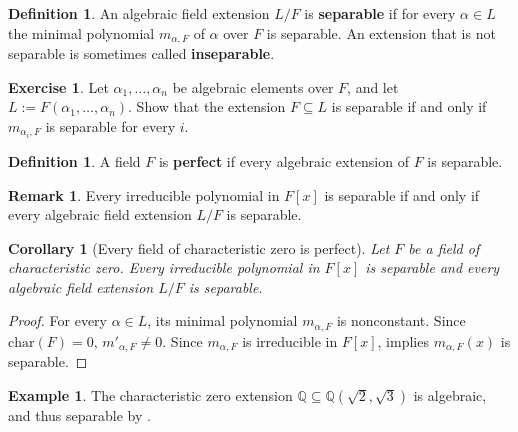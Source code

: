 \documentclass[12pt]{report}
\newtheorem{corollary}[theorem]{Corollary}
\numberwithin{equation}{section}
\numberwithin{theorem}{chapter}
\theoremstyle{definition}
\newtheorem{definition}[theorem]{Definition}
\newtheorem{example}[theorem]{Example}
\newtheorem{exercise}{Exercise}
\newtheorem*{basic properties}{Basic Properties}
\newtheorem*{Important Remark}{Important Remark}
\newtheorem{remark}[theorem]{Remark}
\newcommand{\df}[1]{{\bf #1}\index{#1}}
\begin{document}
\begin{definition} 
An algebraic field extension $L/F$ is {\bf separable} if for every $\alpha \in L$ the minimal polynomial $m_{\alpha, F}$ of $\alpha$ over $F$ is separable. An extension that is not separable is sometimes called \df{inseparable}.
\end{definition}


\begin{exercise}\label{separable just check generators}
	Let $\alpha_1, \ldots, \alpha_n$ be algebraic elements over $F$, and let $L := F(\alpha_1, \ldots, \alpha_n)$. Show that the extension $F \subseteq L$ is separable if and only if $m_{\alpha_i, F}$ is separable for every $i$.
\end{exercise}



\begin{definition}
	A field $F$ is {\bf perfect} if every algebraic extension of $F$ is separable. 
\end{definition}


\begin{remark}
Every irreducible polynomial in $F[x]$ is separable if and only if every algebraic field extension $L/F$ is separable.
\end{remark}


\begin{corollary}[Every field of characteristic zero is perfect]\label{all separable in char 0}
Let $F$ be a field of characteristic zero. Every irreducible polynomial in $F[x]$ is separable and every algebraic field extension $L/F$ is separable.
\end{corollary}

\begin{proof}
For every $\alpha \in L$, its minimal polynomial $m_{\alpha, F}$ is nonconstant. Since $\mathrm{char}(F)=0$, $m'_{\alpha, F} \neq 0$. Since $m_{\alpha, F}$ is irreducible in $F[x]$,  implies $m_{\alpha, F}(x)$ is separable.
\end{proof}


\begin{example}
	The characteristic zero extension $\mathbb{Q} \subseteq \mathbb{Q}(\sqrt{2}, \sqrt{3})$ is algebraic, and thus separable by .
\end{example}
\end{document}
